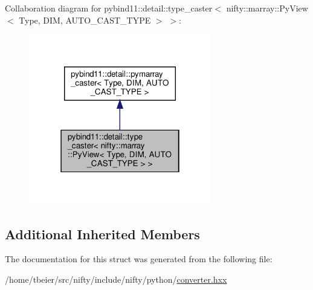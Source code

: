 Collaboration diagram for pybind11\+:\+:detail\+:\+:type\+\_\+caster$<$ nifty\+:\+:marray\+:\+:Py\+View$<$ Type, D\+IM, A\+U\+T\+O\+\_\+\+C\+A\+S\+T\+\_\+\+T\+Y\+PE $>$ $>$\+:
\nopagebreak
\begin{figure}[H]
\begin{center}
\leavevmode
\includegraphics[width=226pt]{structpybind11_1_1detail_1_1type__caster_3_01nifty_1_1marray_1_1PyView_3_01Type_00_01DIM_00_01AU16b26df79ae2a442d9b79366b05a761c}
\end{center}
\end{figure}
\subsection*{Additional Inherited Members}


The documentation for this struct was generated from the following file\+:\begin{DoxyCompactItemize}
\item 
/home/tbeier/src/nifty/include/nifty/python/\hyperlink{converter_8hxx}{converter.\+hxx}\end{DoxyCompactItemize}
